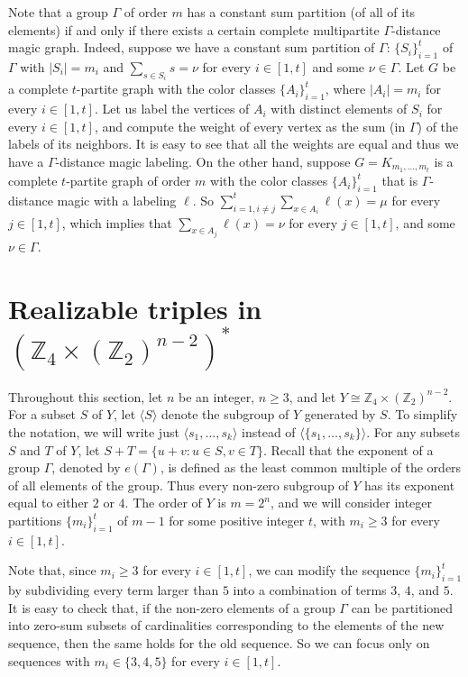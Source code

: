 \documentclass[final]{dmtcs-episciences}
\newcommand{\zet}{\mathbb{Z}}
\begin{document}
Note that a group $\Gamma$ of order $m$ has a constant sum partition (of all of its elements) if and only if there exists a certain complete multipartite $\Gamma$-distance magic graph. Indeed, suppose we have a constant sum partition of $\Gamma$: $\{S_i\}_{i=1}^t$ of $\Gamma$ with $|S_i| = m_i$ and $\sum_{s\in S_i}s = \nu$ for every {$i\in[1,t]$} and some $\nu \in \Gamma$. Let $G$ be a complete $t$-partite graph with the color classes $\{A_i\}_{i=1}^t$, where $|A_i|=m_i$ for every  {$i\in[1 ,t]$}. Let us label the vertices of $A_i$ with distinct elements of $S_i$ for every {$i\in[1 ,t]$}, and compute the weight of every vertex as the sum (in $\Gamma$) of the labels of its neighbors. It is easy to see that all the weights are equal and thus we have a $\Gamma$-distance magic labeling. On the other hand, suppose $G=K_{m_1,\ldots,m_t}$ is a complete $t$-partite graph of order $m$ with the color classes $\{A_i\}_{i=1}^t$ that is $\Gamma$-distance magic  {with a labeling $\ell$}. So $\sum_{i=1,i\neq j}^t\sum_{x\in A_i}\ell(x) = \mu$ for every {$j\in[1 , t]$}, which implies that $\sum_{x\in A_j}\ell(x) = \nu$ for every  {$j\in[1 , t]$}, and some $\nu\in\Gamma$. 
 
\section{\texorpdfstring{Realizable triples in $\left(\zet_4\times(\zet_2)^{n-2}\right)^*$}{Realizable triples}}\label{sec:rt}

Throughout this section, let $n$ be an integer, $n \geq 3$, and let  $Y\cong\zet_4\times(\zet_2)^{n-2}$. For a subset $S$ of $Y$, let $\langle S\rangle$ denote the subgroup of $Y$ generated by $S$. To simplify the notation, we will write just $\langle s_1, \dots, s_k \rangle$ instead of $\langle \{ s_1, \dots, s_k \} \rangle$. For any subsets $S$ and $T$ of $Y$, let $S+T=\{u+v\colon u\in S, v\in T\}$. Recall that the exponent of a group $\Gamma$, denoted by $e(\Gamma)$, is defined as the least common multiple of the orders of all elements of the group. Thus every non-zero subgroup of $Y$ has its exponent equal to either $2$ or $4$. The order of $Y$ is $m=2^n$, and we will consider integer partitions $\{m_i\}_{i=1}^t$ of $m-1$ for some positive integer $t$, with $m_i \geq 3$ for every {$i\in[1,t]$}.

Note that, since $m_i\geq 3$ for every $i\in[1,t]$, we can modify the sequence $\{m_i\}_{i=1}^t$ by subdividing every term larger than $5$ into a combination of terms $3$, $4$, and $5$. It is easy to check that, if the non-zero elements of a group $\Gamma$ can be partitioned into zero-sum subsets of cardinalities corresponding to the elements of the new sequence, then the same holds for the old sequence. So we can focus only on sequences with $m_i \in \{3, 4, 5\}$ for every $i\in[1,t]$.
\end{document}
